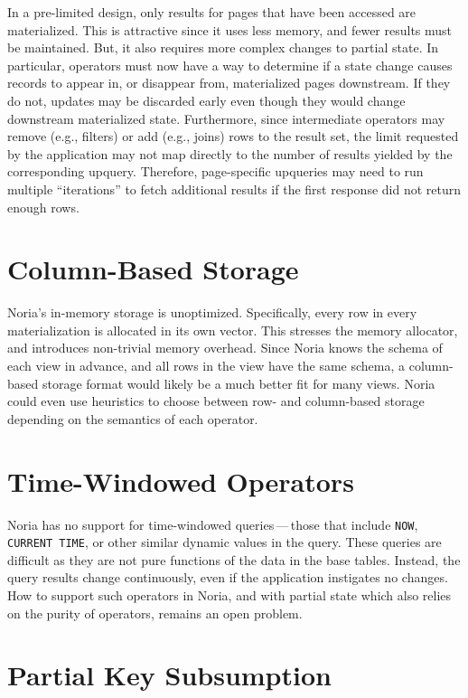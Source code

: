 In a pre-limited design, only results for pages that have been accessed are
materialized. This is attractive since it uses less memory, and fewer results
must be maintained. But, it also requires more complex changes to partial state.
In particular, operators must now have a way to determine if a state change
causes records to appear in, or disappear from, materialized pages downstream.
If they do not, updates may be discarded early even though they would change
downstream materialized state. Furthermore, since intermediate operators may
remove (e.g., filters) or add (e.g., joins) rows to the result set, the limit
requested by the application may not map directly to the number of results
yielded by the corresponding upquery. Therefore, page-specific upqueries may
need to run multiple ``iterations'' to fetch additional results if the first
response did not return enough rows.

\section{Column-Based Storage}

Noria's in-memory storage is unoptimized. Specifically, every row in every
materialization is allocated in its own vector. This stresses the memory
allocator, and introduces non-trivial memory overhead. Since Noria knows the
schema of each view in advance, and all rows in the view have the same schema, a
column-based storage format would likely be a much better fit for many views.
Noria could even use heuristics to choose between row- and column-based storage
depending on the semantics of each operator.

\section{Time-Windowed Operators}

Noria has no support for time-windowed queries\,---\,those that include
\texttt{NOW}, \texttt{CURRENT TIME}, or other similar dynamic values in the
query. These queries are difficult as they are not pure functions of the data in
the base tables. Instead, the query results change continuously, even if the
application instigates no changes. How to support such operators in Noria, and
with partial state which also relies on the purity of operators, remains an open
problem.

\section{Partial Key Subsumption}

